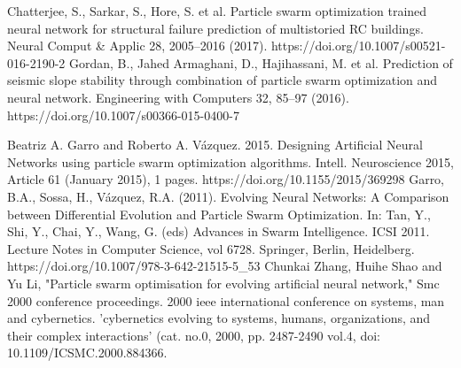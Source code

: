 \documentclass[conference]{IEEEtran}
\begin{document}
\begin{thebibliography}{00}

 Chatterjee, S., Sarkar, S., Hore, S. et al. Particle swarm optimization trained neural network for structural failure prediction of multistoried RC buildings. Neural Comput \& Applic 28, 2005–2016 (2017). https://doi.org/10.1007/s00521-016-2190-2
 Gordan, B., Jahed Armaghani, D., Hajihassani, M. et al. Prediction of seismic slope stability through combination of particle swarm optimization and neural network. Engineering with Computers 32, 85–97 (2016). https://doi.org/10.1007/s00366-015-0400-7

 Beatriz A. Garro and Roberto A. Vázquez. 2015. Designing Artificial Neural Networks using particle swarm optimization algorithms. Intell. Neuroscience 2015, Article 61 (January 2015), 1 pages. https://doi.org/10.1155/2015/369298
 Garro, B.A., Sossa, H., Vázquez, R.A. (2011). Evolving Neural Networks: A Comparison between Differential Evolution and Particle Swarm Optimization. In: Tan, Y., Shi, Y., Chai, Y., Wang, G. (eds) Advances in Swarm Intelligence. ICSI 2011. Lecture Notes in Computer Science, vol 6728. Springer, Berlin, Heidelberg. https://doi.org/10.1007/978-3-642-21515-5\_53
 Chunkai Zhang, Huihe Shao and Yu Li, "Particle swarm optimisation for evolving artificial neural network," Smc 2000 conference proceedings. 2000 ieee international conference on systems, man and cybernetics. 'cybernetics evolving to systems, humans, organizations, and their complex interactions' (cat. no.0, 2000, pp. 2487-2490 vol.4, doi: 10.1109/ICSMC.2000.884366.
\end{thebibliography}
\end{document}
